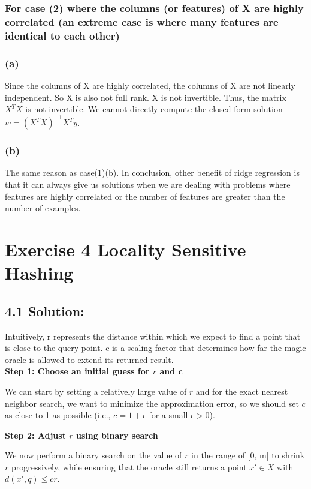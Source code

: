 \documentclass{article}
\begin{document}
\subsubsection*{For case (2) where the columns (or features) of X are highly correlated (an extreme case is where many features are identical to each other)}
\subsubsection*{(a)}
Since the columns of X are highly correlated, the columns of X are not linearly independent. So X is also not full rank. X is not invertible. Thus, the matrix $X^T X$ is not invertible. We cannot directly compute the closed-form solution $w = (X^T X)^{-1} X^T y$.
\subsubsection*{(b)}
The same reason as case(1)(b).
In conclusion, other benefit of ridge regression is that it can always give us solutions when we are dealing with problems where features are highly correlated or the number of features are greater than the number of examples.

\newpage
\section*{Exercise 4 Locality Sensitive Hashing}
\subsection*{4.1 Solution:}
Intuitively, r represents the distance within which we expect to find a point that is close to the query point. c is a scaling factor that determines how far the magic oracle is allowed to extend its returned result.\\
\textbf{Step 1: Choose an initial guess for \( r \) and c}

We can start by setting a relatively large value of \( r \) and for the exact nearest neighbor search, we want to minimize the approximation error, so we should set \( c \) as close to 1 as possible (i.e., \( c = 1 + \epsilon \) for a small \( \epsilon > 0 \)).

\textbf{Step 2: Adjust \( r \) using binary search}

We now perform a binary search on the value of \( r \) in the range of [0, m] to shrink \( r \) progressively, while ensuring that the oracle still returns a point \( x' \in X \) with \( d(x', q) \leq cr \).
\end{document}
